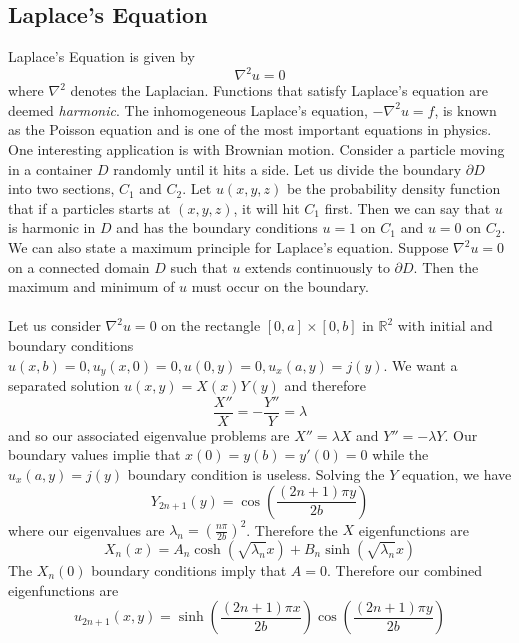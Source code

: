 \documentclass{article}
\newcommand{\R}{\mathbb{R}}
\newcommand{\lap}{\nabla ^2}
\theoremstyle{definition}
\begin{document}
\subsection{Laplace's Equation}
Laplace's Equation is given by 
\begin{equation*}
    \lap u = 0
\end{equation*}
where $\lap$ denotes the Laplacian. Functions that satisfy Laplace's equation are deemed \emph{harmonic}. The inhomogeneous Laplace's equation, $-\lap u=f$, is known as the Poisson equation and is one of the most important equations in physics. One interesting application is with Brownian motion. Consider a particle moving in a container $D$ randomly until it hits a side. Let us divide the boundary $\partial D$ into two sections, $C_1$ and $C_2$. Let $u(x,y,z)$ be the probability density function that if a particles starts at $(x,y,z)$, it will hit $C_1$ first. Then we can say that $u$ is harmonic in $D$ and has the boundary conditions $u=1$ on $C_1$ and $u=0$ on $C_2$. We can also state a maximum principle for Laplace's equation. Suppose $\lap u=0$ on a connected domain $D$ such that $u$ extends continuously to $\partial D$. Then the maximum and minimum of $u$ must occur on the boundary. \\\\
Let us consider $\lap u=0$ on the rectangle $[0,a]\times [0,b]$ in $\R^2$ with initial and boundary conditions $u(x,b)=0,u_y(x,0)=0, u(0,y)=0,u_x(a,y)=j(y)$. We want a separated solution $u(x,y)=X(x)Y(y)$ and therefore 
\begin{equation*}
    \frac{X''}{X} = - \frac{Y''}{Y} =\lambda
\end{equation*}
and so our associated eigenvalue problems are $X'' = \lambda X $ and $Y''=-\lambda Y$. Our boundary values implie that $x(0)=y(b)=y'(0)=0$ while the $u_x(a,y)=j(y)$ boundary condition is useless. Solving the $Y$ equation, we have 
\begin{equation*}
    Y_{2n+1}(y) = \cos \left(\frac{(2n+1)\pi y}{2b}\right)
\end{equation*}
where our eigenvalues are $\lambda_n = \left(\frac{n\pi}{2b} \right)^2$. Therefore the $X$ eigenfunctions are 
\begin{equation*}
    X_n(x) = A_n \cosh \left(\sqrt{\lambda_n}x\right)+B_n\sinh \left( \sqrt{\lambda_n}x\right)
\end{equation*}
The $X_n(0)$ boundary conditions imply that $A=0$. Therefore our combined eigenfunctions are 
\begin{equation*}
    u_{2n+1}(x,y)= \sinh \left( \frac{(2n+1)\pi x}{2b}\right) \cos \left( \frac{(2n+1)\pi y}{2b} \right)
\end{equation*}
\end{document}
